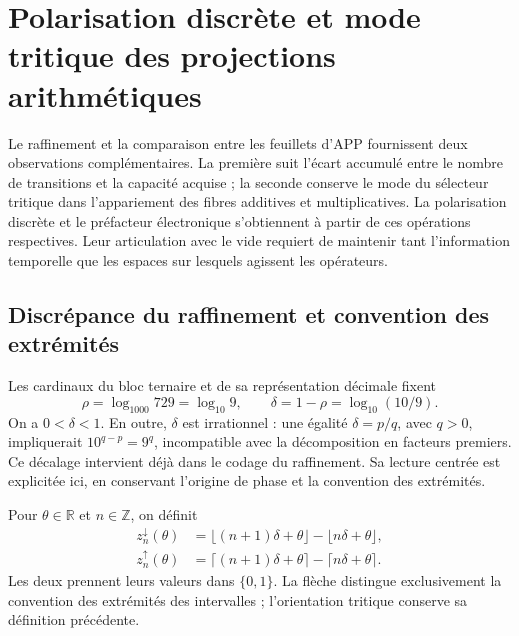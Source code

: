 \section{Polarisation discrète et mode tritique des projections arithmétiques}
\label{iii:iii:sec:vacancias-prefactor}

Le raffinement et la comparaison entre les feuillets d’APP fournissent deux
observations complémentaires. La première suit l’écart accumulé
entre le nombre de transitions et la capacité acquise ; la seconde conserve
le mode du sélecteur tritique dans l’appariement des fibres additives et
multiplicatives. La polarisation discrète et le préfacteur électronique
s’obtiennent à partir de ces opérations respectives. Leur articulation avec le vide
requiert de maintenir tant l’information temporelle que les espaces sur
lesquels agissent les opérateurs.

\subsection{Discrépance du raffinement et convention des extrémités}

Les cardinaux du bloc ternaire et de sa représentation décimale fixent
\[
 \rho=\log_{1000}729=\log_{10}9,\qquad
 \delta=1-\rho=\log_{10}(10/9).
\]
On a $0<\delta<1$. En outre, $\delta$ est irrationnel : une égalité $\delta=p/q$, avec $q>0$, impliquerait $10^{q-p}=9^q$, incompatible avec la décomposition en facteurs premiers. Ce décalage intervient déjà dans le codage du raffinement. Sa lecture centrée est explicitée ici, en conservant l'origine de phase et la convention des extrémités.

\begin{definition}
Pour $\theta\in\mathbb R$ et $n\in\mathbb Z$, on définit
\begin{align}
 z_n^{\downarrow}(\theta)
 &=\lfloor(n+1)\delta+\theta\rfloor-\lfloor n\delta+\theta\rfloor,
 \label{iii:iii:vp:lower}\\
 z_n^{\uparrow}(\theta)
 &=\lceil(n+1)\delta+\theta\rceil-\lceil n\delta+\theta\rceil.
 \label{iii:iii:vp:upper}
\end{align}
Les deux prennent leurs valeurs dans $\{0,1\}$. La flèche distingue exclusivement la convention des extrémités des intervalles ; l'orientation tritique conserve sa définition précédente.
\end{definition}

